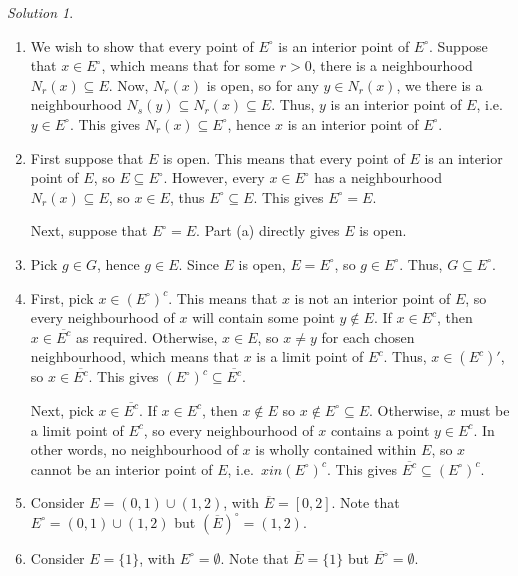 \documentclass[11pt]{report}
\theoremstyle{remark}
\newtheorem*{solution}{Solution}
\begin{document}
    \begin{solution} \mbox{}
        \begin{enumerate}
            \itemsep0em
            \item We wish to show that every point of $E^\circ$ is an interior point
            of $E^\circ$. Suppose that $x \in E^\circ$, which means that for some
            $r > 0$, there is a neighbourhood $N_{r}(x) \subseteq E$. Now, $N_r(x)$
            is open, so for any $y \in N_r(x)$, we there is a neighbourhood $N_s(y)
            \subseteq N_r(x) \subseteq E$. Thus, $y$ is an interior point of
            $E$, i.e.\ $y \in E^\circ$. This gives $N_r(x) \subseteq E^\circ$, hence
            $x$ is an interior point of $E^\circ$.

            \item First suppose that $E$ is open. This means that every point of $E$
            is an interior point of $E$, so $E \subseteq E^\circ$. However, every $x
            \in E^\circ$ has a neighbourhood $N_r(x) \subseteq E$, so $x \in E$,
            thus $E^\circ \subseteq E$. This gives $E^\circ = E$.

            Next, suppose that $E^\circ = E$. Part (a) directly gives $E$ is open.

            \item Pick $g \in G$, hence $g \in E$. Since $E$ is open, $E = E^\circ$,
            so $g \in E^\circ$. Thus, $G \subseteq E^\circ$.

            \item First, pick $x \in (E^\circ)^c$. This means that $x$ is not an
            interior point of $E$, so every neighbourhood of $x$ will contain some
            point $y \notin E$. If $x \in E^c$, then $x \in \overline{E^c}$ as
            required. Otherwise, $x \in E$, so $x \neq y$ for each chosen
            neighbourhood, which means that $x$ is a limit point of $E^c$. Thus, $x
            \in (E^c)'$, so $x \in \overline{E^c}$. This gives $(E^\circ)^c
            \subseteq \overline{E^c}$.

            Next, pick $x \in \overline{E^c}$. If $x \in E^c$, then $x \notin E$ so
            $x \notin E^\circ \subseteq E$. Otherwise, $x$ must be a limit point of
            $E^c$, so every neighbourhood of $x$ contains a point $y \in E^c$. In
            other words, no neighbourhood of $x$ is wholly contained within $E$, so
            $x$ cannot be an interior point of $E$, i.e.\ $x in (E^\circ)^c$. This
            gives $\overline{E^c} \subseteq (E^\circ)^c$.

            \item Consider $E = (0, 1) \cup (1, 2)$, with $\overline{E} = [0, 2]$.
            Note that $E^\circ = (0, 1) \cup (1, 2)$ but $(\overline{E})^\circ = (1,
            2)$.

            \item Consider $E = \{1\}$, with $E^\circ = \emptyset$. Note that
            $\overline{E} = \{1\}$ but $\overline{E^\circ} = \emptyset$.
        \end{enumerate}
    \end{solution}
    
\end{document}
